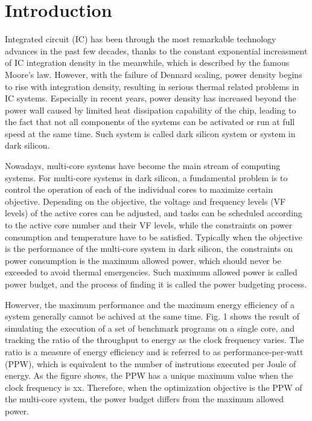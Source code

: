 \section{Introduction}

Integrated circuit (IC) has been through the most remarkable technology advances in the past few decades, thanks to the constant exponential increasment of IC integration density in the meanwhile, which is described by the famous Moore's law. However, with the failure of Dennard scaling, power density begins to rise with integration density, resulting in serious thermal related problems in IC systems. Especially in recent years, power density has increased beyond the power wall caused by limited heat dissipation capability of the chip, leading to the fact that not all components of the systems can be activated or run at full speed at the same time. Such system is called dark silicon system or system in dark silicon.

Nowadays, multi-core systems have become the main stream of computing systems. For multi-core systems in dark silicon, a fundamental problem is to control the operation of each of the individual cores to maximize certain objective. Depending on the objective, the voltage and frequency levels (VF levels) of the active cores can be adjusted, and tasks can be scheduled according to the active core number and their VF levels, while the constraints on power consumption and temperature have to be satisfied. Typically when the objective is the performance of the multi-core system in dark silicon, the constraints on power consumption is the maximum allowed power, which should never be exceeded to avoid thermal emergencies. Such maximum allowed power is called power budget, and the process of finding it is called the power budgeting process. 

Howerver, the maximum performance and the maximum energy efficiency of a system generally cannot be achived at the same time. Fig. 1 shows the result of simulating the execution of a set of benchmark programs on a single core, and tracking the ratio of the throughput to energy as the clock frequency varies. The ratio is a measure of energy efficiency and is referred to as performance-per-watt (PPW), which is equivalent to the number of instrutions executed per Joule of energy. As the figure shows, the PPW has a unique maximum value when the clock frequency is xx. Therefore, when the optimization objective is the PPW of the multi-core system, the power budget differs from the maximum allowed power. 



